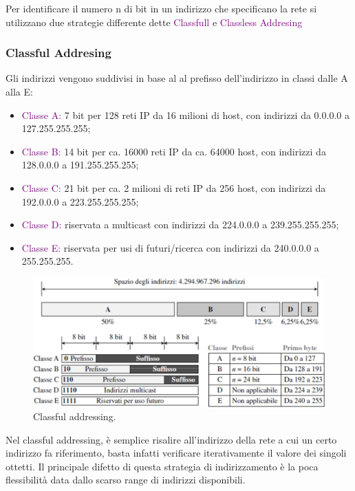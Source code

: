Per identificare il numero n di bit in un indirizzo che specificano la rete si utilizzano due strategie differente dette \textcolor{purple}{Classfull} e \textcolor{purple}{Classless Addresing}

\subsubsection{Classful Addresing}
Gli indirizzi vengono suddivisi in base al al prefisso dell'indirizzo in classi dalle A alla E:
\begin{itemize}
    \item \textcolor{purple}{Classe A:} 7 bit per 128 reti IP da 16 milioni di host, con indirizzi da 0.0.0.0 a 127.255.255.255;
    \item \textcolor{purple}{Classe B:} 14 bit per ca. 16000 reti IP da ca. 64000 host, con indirizzi da 128.0.0.0 a 191.255.255.255;
    \item \textcolor{purple}{Classe C:} 21 bit per ca. 2 milioni di reti IP da 256 host, con indirizzi da 192.0.0.0 a 223.255.255.255;
    \item \textcolor{purple}{Classe D:} riservata a multicast con indirizzi da 224.0.0.0 a 239.255.255.255;
    \item \textcolor{purple}{Classe E:} riservata per usi di futuri/ricerca con indirizzi da 240.0.0.0 a 255.255.255.
\end{itemize}

\begin{figure}[h]
    \centering
    \includegraphics[scale=0.27]{Immagini/ClassfulAddressingIP.png}
    \caption{Classful addressing.}
\end{figure}

Nel classful addressing, è semplice risalire all'indirizzo della rete a cui un certo indirizzo fa riferimento, basta infatti verificare iterativamente il valore dei singoli ottetti. Il principale difetto di questa strategia di indirizzamento è la poca flessibilità data dallo scarso range di indirizzi disponibili.

